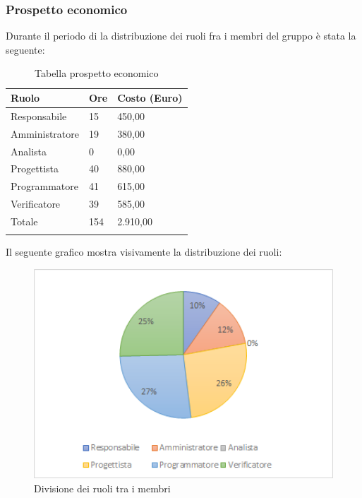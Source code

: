 \subsubsection{Prospetto economico}
Durante il periodo di  la distribuzione dei ruoli fra i membri del gruppo è stata la seguente:
\begin{center}
	\renewcommand{\arraystretch}{1.5}
	\begin{longtable}[H]{  p{5.6cm}  p{3cm} p{3cm}  }
		\rowcolor{tableHeadYellow}
		\textbf{Ruolo}   & \textbf{Ore} & \textbf{Costo (Euro)} \\ 
		\endhead
		Responsabile   & 15   & 450,00 \\
		Amministratore & 19   & 380,00 \\
		Analista       & 0    & 0,00 \\
		Progettista    & 40   & 880,00 \\
		Programmatore  & 41   & 615,00 \\
		Verificatore   & 39   & 585,00 \\
		Totale         & 154  & 2.910,00 \\
		\rowcolor{white}
		\caption{Tabella prospetto economico}
	\end{longtable}
\end{center}
Il seguente grafico mostra visivamente la distribuzione dei ruoli:
\begin{figure}[H]
	\centering
	\includegraphics[width=15cm,keepaspectratio]{../includes/pics/grafici/grafico10.png}
	\caption{\label{fig:mission}Divisione dei ruoli tra i membri}
\end{figure}
\clearpage
